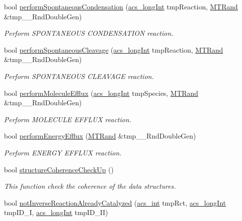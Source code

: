 \begin{DoxyCompactItemize}
bool \hyperlink{a00011_acc764a05297ae00db52360f3df5ed1d5}{perform\-Spontaneous\-Condensation} (\hyperlink{a00024_a19319d75f02db4308bc5c0026d98cd85}{acs\-\_\-long\-Int} tmp\-Reaction, \hyperlink{a00016}{M\-T\-Rand} \&tmp\-\_\-\-\_\-\-Rnd\-Double\-Gen)
\begin{DoxyCompactList}\small\item\em Perform S\-P\-O\-N\-T\-A\-N\-E\-O\-U\-S C\-O\-N\-D\-E\-N\-S\-A\-T\-I\-O\-N reaction. \end{DoxyCompactList}\item 
bool \hyperlink{a00011_a4949138a3771b7f6ec2bfe82cbad947e}{perform\-Spontaneous\-Cleavage} (\hyperlink{a00024_a19319d75f02db4308bc5c0026d98cd85}{acs\-\_\-long\-Int} tmp\-Reaction, \hyperlink{a00016}{M\-T\-Rand} \&tmp\-\_\-\-\_\-\-Rnd\-Double\-Gen)
\begin{DoxyCompactList}\small\item\em Perform S\-P\-O\-N\-T\-A\-N\-E\-O\-U\-S C\-L\-E\-A\-V\-A\-G\-E reaction. \end{DoxyCompactList}\item 
bool \hyperlink{a00011_ad072a40a7d9521379c7ff50ed8110fbe}{perform\-Molecule\-Efflux} (\hyperlink{a00024_a19319d75f02db4308bc5c0026d98cd85}{acs\-\_\-long\-Int} tmp\-Species, \hyperlink{a00016}{M\-T\-Rand} \&tmp\-\_\-\-\_\-\-Rnd\-Double\-Gen)
\begin{DoxyCompactList}\small\item\em Perform M\-O\-L\-E\-C\-U\-L\-E E\-F\-F\-L\-U\-X reaction. \end{DoxyCompactList}\item 
bool \hyperlink{a00011_aff7607e0f3a74790109a7d87de3031bd}{perform\-Energy\-Efflux} (\hyperlink{a00016}{M\-T\-Rand} \&tmp\-\_\-\-\_\-\-Rnd\-Double\-Gen)
\begin{DoxyCompactList}\small\item\em Perform E\-N\-E\-R\-G\-Y E\-F\-F\-L\-U\-X reaction. \end{DoxyCompactList}\item 
bool \hyperlink{a00011_a6606b08f25751a8796c13810962b385e}{structure\-Coherence\-Check\-Up} ()
\begin{DoxyCompactList}\small\item\em This function check the coherence of the data structures. \end{DoxyCompactList}\item 
bool \hyperlink{a00011_a5160dec152ed0369fe8af9aff3253a9e}{not\-Inverse\-Reaction\-Already\-Catalyzed} (\hyperlink{a00024_a8d277355641a098190360234e2ebde35}{acs\-\_\-int} tmp\-Rct, \hyperlink{a00024_a19319d75f02db4308bc5c0026d98cd85}{acs\-\_\-long\-Int} tmp\-I\-D\-\_\-\-I, \hyperlink{a00024_a19319d75f02db4308bc5c0026d98cd85}{acs\-\_\-long\-Int} tmp\-I\-D\-\_\-\-I\-I)

\end{DoxyCompactItemize}
